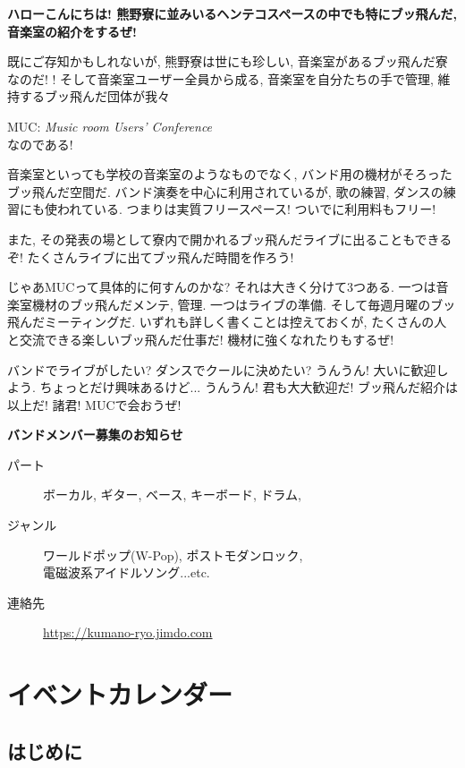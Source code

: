 \documentclass[10pt,b5jsbook,dvips,dvipdfmx,openany]{jsbook}
\theoremstyle{definition}
\begin{document}
	{\fontsize{17pt}{23pt}\selectfont \bf ハローこんにちは! 熊野寮に並みいるヘンテコスペースの中でも特にブッ飛んだ, 音楽室の紹介をするぜ!

	既にご存知かもしれないが, 熊野寮は世にも珍しい, 音楽室があるブッ飛んだ寮なのだ! !
	そして音楽室ユーザー全員から成る, 音楽室を自分たちの手で管理, 維持するブッ飛んだ団体が我々

	MUC:  \textit{Music room Users' Conference}  \\ なのである!

	音楽室といっても学校の音楽室のようなものでなく, バンド用の機材がそろったブッ飛んだ空間だ. バンド演奏を中心に利用されているが, 歌の練習, ダンスの練習にも使われている. つまりは実質フリースペース! ついでに利用料もフリー!

	また, その発表の場として寮内で開かれるブッ飛んだライブに出ることもできるぞ! たくさんライブに出てブッ飛んだ時間を作ろう!

	じゃあMUCって具体的に何すんのかな? それは大きく分けて3つある. 一つは音楽室機材のブッ飛んだメンテ, 管理. 一つはライブの準備. そして毎週月曜のブッ飛んだミーティングだ. いずれも詳しく書くことは控えておくが, たくさんの人と交流できる楽しいブッ飛んだ仕事だ! 機材に強くなれたりもするぜ!

	バンドでライブがしたい? ダンスでクールに決めたい? うんうん! 大いに歓迎しよう. ちょっとだけ興味あるけど... うんうん! 君も大大歓迎だ! ブッ飛んだ紹介は以上だ! 諸君! MUCで会おうぜ!

		}


\begin{boxnote}
{\Large
	\textbf{バンドメンバー募集のお知らせ}
	\begin{description}
	\item[パート] ボーカル, ギター, ベース, キーボード, ドラム,
	\item[ジャンル] ワールドポップ(W-Pop), ポストモダンロック, \\ 電磁波系アイドルソング...etc.
	\item[連絡先] \url{https://kumano-ryo.jimdo.com}
	\end{description}
	}
	\end{boxnote}


\newpage

	\section{イベントカレンダー}

		\subsection{はじめに}
\end{document}
